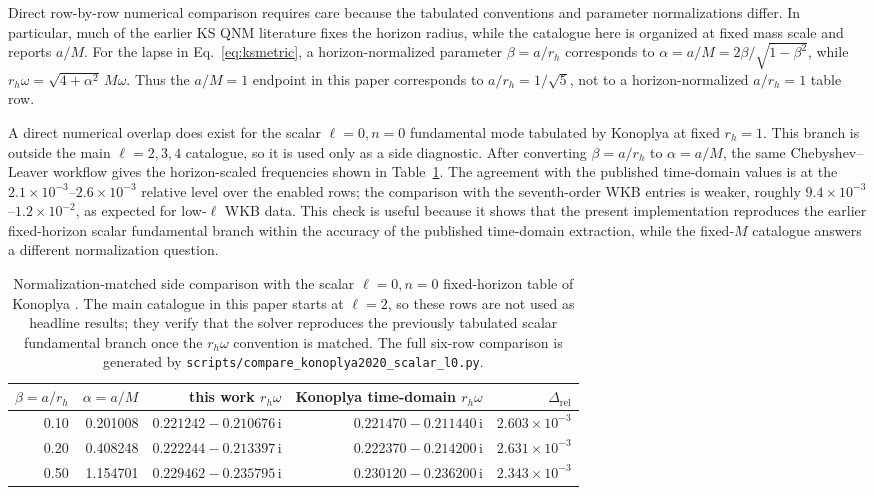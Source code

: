 ﻿\documentclass[12pt,a4paper]{article}
\newcommand{\ii}{\mathrm{i}}
\begin{document}
Direct row-by-row numerical comparison requires care because the tabulated conventions and parameter normalizations differ. In particular, much of the earlier KS QNM literature fixes the horizon radius, while the catalogue here is organized at fixed mass scale and reports \(a/M\). For the lapse in Eq.~\eqref{eq:ksmetric}, a horizon-normalized parameter \(\beta=a/r_h\) corresponds to \(\alpha=a/M=2\beta/\sqrt{1-\beta^2}\), while \(r_h\omega=\sqrt{4+\alpha^2}\,M\omega\). Thus the \(a/M=1\) endpoint in this paper corresponds to \(a/r_h=1/\sqrt{5}\), not to a horizon-normalized \(a/r_h=1\) table row.

A direct numerical overlap does exist for the scalar \(\ell=0,n=0\) fundamental mode tabulated by Konoplya at fixed \(r_h=1\). This branch is outside the main \(\ell=2,3,4\) catalogue, so it is used only as a side diagnostic. After converting \(\beta=a/r_h\) to \(\alpha=a/M\), the same Chebyshev--Leaver workflow gives the horizon-scaled frequencies shown in Table~\ref{tab:konoplyacomparison}. The agreement with the published time-domain values is at the \(2.1\times10^{-3}\)--\(2.6\times10^{-3}\) relative level over the enabled rows; the comparison with the seventh-order WKB entries is weaker, roughly \(9.4\times10^{-3}\)--\(1.2\times10^{-2}\), as expected for low-\(\ell\) WKB data. This check is useful because it shows that the present implementation reproduces the earlier fixed-horizon scalar fundamental branch within the accuracy of the published time-domain extraction, while the fixed-\(M\) catalogue answers a different normalization question.

\begin{table}[H]
\centering
\footnotesize
\renewcommand{\arraystretch}{1.14}
\begin{tabular}{rrrrr}
\toprule
\(\beta=a/r_h\) & \(\alpha=a/M\) &
this work \(r_h\omega\) & Konoplya time-domain \(r_h\omega\) &
\(\Delta_{\mathrm{rel}}\)\\
\midrule
0.10 & 0.201008 & \(0.221242-0.210676\,\ii\) & \(0.221470-0.211440\,\ii\) & \(2.603\times10^{-3}\)\\
0.20 & 0.408248 & \(0.222244-0.213397\,\ii\) & \(0.222370-0.214200\,\ii\) & \(2.631\times10^{-3}\)\\
0.50 & 1.154701 & \(0.229462-0.235795\,\ii\) & \(0.230120-0.236200\,\ii\) & \(2.343\times10^{-3}\)\\
\bottomrule
\end{tabular}
\caption{Normalization-matched side comparison with the scalar \(\ell=0,n=0\) fixed-horizon table of Konoplya \cite{Konoplya2020}. The main catalogue in this paper starts at \(\ell=2\), so these rows are not used as headline results; they verify that the solver reproduces the previously tabulated scalar fundamental branch once the \(r_h\omega\) convention is matched. The full six-row comparison is generated by \texttt{scripts/compare\_konoplya2020\_scalar\_l0.py}.}
\label{tab:konoplyacomparison}
\end{table}
\end{document}

